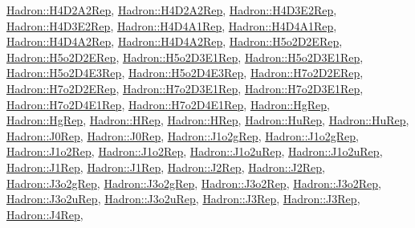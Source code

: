 \mbox{\hyperlink{structHadron_1_1H4D2A2Rep}{Hadron\+::\+H4\+D2\+A2\+Rep}}, \mbox{\hyperlink{structHadron_1_1H4D2A2Rep}{Hadron\+::\+H4\+D2\+A2\+Rep}}, \mbox{\hyperlink{structHadron_1_1H4D3E2Rep}{Hadron\+::\+H4\+D3\+E2\+Rep}}, \mbox{\hyperlink{structHadron_1_1H4D3E2Rep}{Hadron\+::\+H4\+D3\+E2\+Rep}}, \mbox{\hyperlink{structHadron_1_1H4D4A1Rep}{Hadron\+::\+H4\+D4\+A1\+Rep}}, \mbox{\hyperlink{structHadron_1_1H4D4A1Rep}{Hadron\+::\+H4\+D4\+A1\+Rep}}, \mbox{\hyperlink{structHadron_1_1H4D4A2Rep}{Hadron\+::\+H4\+D4\+A2\+Rep}}, \mbox{\hyperlink{structHadron_1_1H4D4A2Rep}{Hadron\+::\+H4\+D4\+A2\+Rep}}, \mbox{\hyperlink{structHadron_1_1H5o2D2ERep}{Hadron\+::\+H5o2\+D2\+E\+Rep}}, \mbox{\hyperlink{structHadron_1_1H5o2D2ERep}{Hadron\+::\+H5o2\+D2\+E\+Rep}}, \mbox{\hyperlink{structHadron_1_1H5o2D3E1Rep}{Hadron\+::\+H5o2\+D3\+E1\+Rep}}, \mbox{\hyperlink{structHadron_1_1H5o2D3E1Rep}{Hadron\+::\+H5o2\+D3\+E1\+Rep}}, \mbox{\hyperlink{structHadron_1_1H5o2D4E3Rep}{Hadron\+::\+H5o2\+D4\+E3\+Rep}}, \mbox{\hyperlink{structHadron_1_1H5o2D4E3Rep}{Hadron\+::\+H5o2\+D4\+E3\+Rep}}, \mbox{\hyperlink{structHadron_1_1H7o2D2ERep}{Hadron\+::\+H7o2\+D2\+E\+Rep}}, \mbox{\hyperlink{structHadron_1_1H7o2D2ERep}{Hadron\+::\+H7o2\+D2\+E\+Rep}}, \mbox{\hyperlink{structHadron_1_1H7o2D3E1Rep}{Hadron\+::\+H7o2\+D3\+E1\+Rep}}, \mbox{\hyperlink{structHadron_1_1H7o2D3E1Rep}{Hadron\+::\+H7o2\+D3\+E1\+Rep}}, \mbox{\hyperlink{structHadron_1_1H7o2D4E1Rep}{Hadron\+::\+H7o2\+D4\+E1\+Rep}}, \mbox{\hyperlink{structHadron_1_1H7o2D4E1Rep}{Hadron\+::\+H7o2\+D4\+E1\+Rep}}, \mbox{\hyperlink{structHadron_1_1HgRep}{Hadron\+::\+Hg\+Rep}}, \mbox{\hyperlink{structHadron_1_1HgRep}{Hadron\+::\+Hg\+Rep}}, \mbox{\hyperlink{structHadron_1_1HRep}{Hadron\+::\+H\+Rep}}, \mbox{\hyperlink{structHadron_1_1HRep}{Hadron\+::\+H\+Rep}}, \mbox{\hyperlink{structHadron_1_1HuRep}{Hadron\+::\+Hu\+Rep}}, \mbox{\hyperlink{structHadron_1_1HuRep}{Hadron\+::\+Hu\+Rep}}, \mbox{\hyperlink{structHadron_1_1J0Rep}{Hadron\+::\+J0\+Rep}}, \mbox{\hyperlink{structHadron_1_1J0Rep}{Hadron\+::\+J0\+Rep}}, \mbox{\hyperlink{structHadron_1_1J1o2gRep}{Hadron\+::\+J1o2g\+Rep}}, \mbox{\hyperlink{structHadron_1_1J1o2gRep}{Hadron\+::\+J1o2g\+Rep}}, \mbox{\hyperlink{structHadron_1_1J1o2Rep}{Hadron\+::\+J1o2\+Rep}}, \mbox{\hyperlink{structHadron_1_1J1o2Rep}{Hadron\+::\+J1o2\+Rep}}, \mbox{\hyperlink{structHadron_1_1J1o2uRep}{Hadron\+::\+J1o2u\+Rep}}, \mbox{\hyperlink{structHadron_1_1J1o2uRep}{Hadron\+::\+J1o2u\+Rep}}, \mbox{\hyperlink{structHadron_1_1J1Rep}{Hadron\+::\+J1\+Rep}}, \mbox{\hyperlink{structHadron_1_1J1Rep}{Hadron\+::\+J1\+Rep}}, \mbox{\hyperlink{structHadron_1_1J2Rep}{Hadron\+::\+J2\+Rep}}, \mbox{\hyperlink{structHadron_1_1J2Rep}{Hadron\+::\+J2\+Rep}}, \mbox{\hyperlink{structHadron_1_1J3o2gRep}{Hadron\+::\+J3o2g\+Rep}}, \mbox{\hyperlink{structHadron_1_1J3o2gRep}{Hadron\+::\+J3o2g\+Rep}}, \mbox{\hyperlink{structHadron_1_1J3o2Rep}{Hadron\+::\+J3o2\+Rep}}, \mbox{\hyperlink{structHadron_1_1J3o2Rep}{Hadron\+::\+J3o2\+Rep}}, \mbox{\hyperlink{structHadron_1_1J3o2uRep}{Hadron\+::\+J3o2u\+Rep}}, \mbox{\hyperlink{structHadron_1_1J3o2uRep}{Hadron\+::\+J3o2u\+Rep}}, \mbox{\hyperlink{structHadron_1_1J3Rep}{Hadron\+::\+J3\+Rep}}, \mbox{\hyperlink{structHadron_1_1J3Rep}{Hadron\+::\+J3\+Rep}}, \mbox{\hyperlink{structHadron_1_1J4Rep}{Hadron\+::\+J4\+Rep}}, 